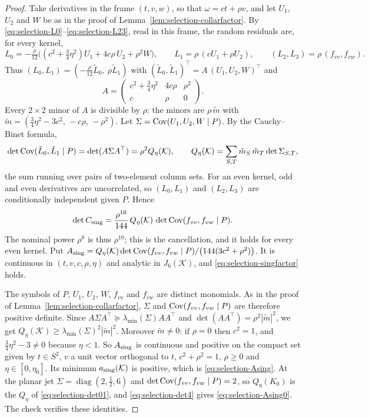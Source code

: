 \begin{proof}
Take derivatives in the frame $(t,v,w)$, so that $\omega=ct+\rho v$, and let $U_1$, $U_2$ and $W$ be as in the proof of Lemma~\ref{lem:selection-collarfactor}. By \eqref{eq:selection-L0}--\eqref{eq:selection-L23}, read in this frame, the random residuals are, for every kernel,
\begin{equation}\label{eq:selection-singlead}
L_0=-\tfrac{\rho}{12}\bigl((c^2+\tfrac34\eta^2)U_1+4c\rho\,U_2+\rho^2W\bigr),\qquad L_1=\rho\,(cU_1+\rho U_2),\qquad (L_2,L_3)=\rho\,(f_{vv},f_{vw}).
\end{equation}
Thus $(L_0,L_1)=(-\frac\rho{12}\tilde L_0,\ \rho\tilde L_1)$ with $(\tilde L_0,\tilde L_1)^{\top}=A\,(U_1,U_2,W)^{\top}$ and
\[
A=\begin{pmatrix}c^2+\frac34\eta^2&4c\rho&\rho^2\\ c&\rho&0\end{pmatrix}.
\]
Every $2\times2$ minor of $A$ is divisible by $\rho$: the minors are $\rho\,\tilde m$ with $\tilde m=(\frac34\eta^2-3c^2,\,-c\rho,\,-\rho^2)$. Let $\Sigma=\operatorname{Cov}(U_1,U_2,W\mid P)$. By the Cauchy--Binet formula,
\[
\det\operatorname{Cov}(\tilde L_0,\tilde L_1\mid P)=\det(A\Sigma A^{\top})=\rho^2Q_\eta(\mathcal K),\qquad Q_\eta(\mathcal K)=\sum_{S,T}\tilde m_S\,\tilde m_T\det\Sigma_{S,T},
\]
the sum running over pairs of two-element column sets. For an even kernel, odd and even derivatives are uncorrelated, so $(L_0,L_1)$ and $(L_2,L_3)$ are conditionally independent given $P$. Hence
\[
\det C_{\rm sing}=\frac{\rho^{10}}{144}\,Q_\eta(\mathcal K)\,\det\operatorname{Cov}(f_{vv},f_{vw}\mid P).
\]
The nominal power $\rho^8$ is thus $\rho^{10}$; this is the cancellation, and it holds for every even kernel. Put $A_{\rm sing}=Q_\eta(\mathcal K)\det\operatorname{Cov}(f_{vv},f_{vw}\mid P)/\bigl(144(3c^2+\rho^2)\bigr)$. It is continuous in $(t,v,c,\rho,\eta)$ and analytic in $J_6(\mathcal K)$, and \eqref{eq:selection-singfactor} holds.

The symbols of $P$, $U_1$, $U_2$, $W$, $f_{vv}$ and $f_{vw}$ are distinct monomials. As in the proof of Lemma~\ref{lem:selection-collarfactor}, $\Sigma$ and $\operatorname{Cov}(f_{vv},f_{vw}\mid P)$ are therefore positive definite. Since $A\Sigma A^{\top}\succcurlyeq\lambda_{\min}(\Sigma)AA^{\top}$ and $\det(AA^{\top})=\rho^2|\tilde m|^2$, we get $Q_\eta(\mathcal K)\ge\lambda_{\min}(\Sigma)^2|\tilde m|^2$. Moreover $\tilde m\ne0$: if $\rho=0$ then $c^2=1$, and $\frac34\eta^2-3\ne0$ because $\eta<1$. So $A_{\rm sing}$ is continuous and positive on the compact set given by $t\in S^2$, $v$ a unit vector orthogonal to $t$, $c^2+\rho^2=1$, $\rho\ge0$ and $\eta\in[0,\eta_0]$. Its minimum $a_{\rm sing}(\mathcal K)$ is positive, which is \eqref{eq:selection-Asing}. At the planar jet $\Sigma=\operatorname{diag}(2,\frac12,6)$ and $\det\operatorname{Cov}(f_{vv},f_{vw}\mid P)=2$, so $Q_\eta(K_0)$ is the $Q_\eta$ of \eqref{eq:selection-det01}, and \eqref{eq:selection-det4} gives \eqref{eq:selection-Asing0}. The check  verifies these identities.


\end{proof}
